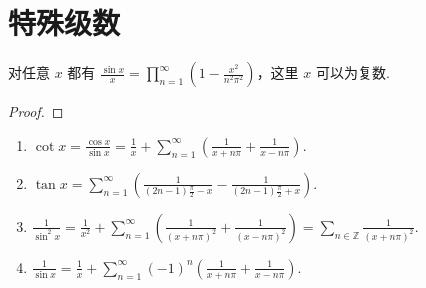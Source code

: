 \documentclass[../../main.tex]{subfiles}%
\begin{document}
\section{特殊级数}

\begin{proposition}\label{proposition:sinx/x因式分解}
对任意 $x$ 都有 $\frac{\sin x}{x} = \prod_{n=1}^{\infty} \left(1 - \frac{x^2}{n^2\pi^2}\right)$，这里 $x$ 可以为复数.
\end{proposition}
\begin{proof}

\end{proof}

\begin{proposition}\label{proposition:三角函数的特殊级数表示}
\begin{enumerate}
\item $\cot x = \frac{\cos x}{\sin x} = \frac{1}{x} + \sum_{n=1}^{\infty} \left( \frac{1}{x + n\pi} + \frac{1}{x - n\pi} \right).$

\item $\tan x = \sum_{n=1}^{\infty} \left( \frac{1}{(2n - 1)\frac{\pi}{2} - x} - \frac{1}{(2n - 1)\frac{\pi}{2} + x} \right) .$

\item $\frac{1}{\sin^2 x} = \frac{1}{x^2} + \sum_{n=1}^{\infty} \left( \frac{1}{(x + n\pi)^2} + \frac{1}{(x - n\pi)^2} \right) = \sum_{n \in \mathbb{Z}} \frac{1}{(x + n\pi)^2}.$

\item $\frac{1}{\sin x} = \frac{1}{x} + \sum_{n=1}^{\infty} (-1)^n \left( \frac{1}{x + n\pi} + \frac{1}{x - n\pi} \right).$
\end{enumerate}
\end{proposition}
\end{document}
